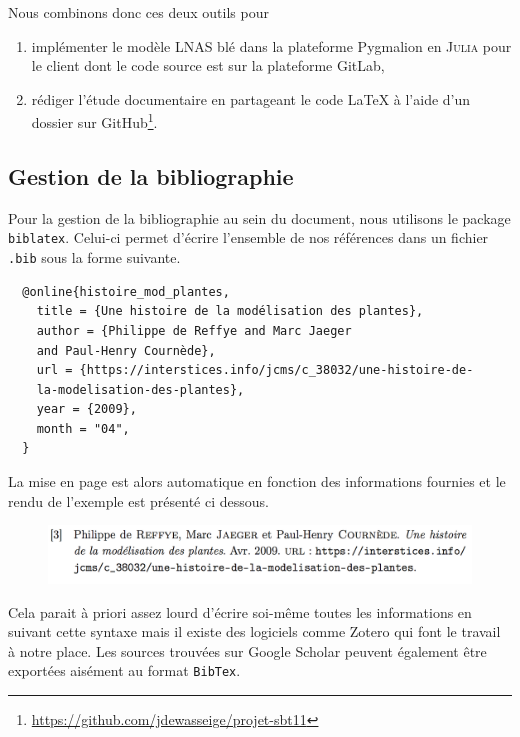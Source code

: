 Nous combinons donc ces deux outils pour 
\begin{enumerate}
  \item implémenter le modèle LNAS blé dans la plateforme
  Pygmalion en \textsc{Julia} %
  pour le client dont le code source est sur la plateforme GitLab,
  \item rédiger l'étude documentaire en partageant le code \LaTeX{}
  à l'aide d'un dossier sur 
  GitHub\footnote{\url{https://github.com/jdewasseige/projet-sbt11}}.
\end{enumerate}


\subsection{Gestion de la bibliographie}
Pour la gestion de la bibliographie au sein du document,
nous utilisons le package \texttt{biblatex}.
Celui-ci permet d'écrire l'ensemble de nos références dans un fichier \texttt{.bib}
sous la forme suivante.
\begin{verbatim}
  @online{histoire_mod_plantes,
    title = {Une histoire de la modélisation des plantes},
    author = {Philippe de Reffye and Marc Jaeger 
    and Paul-Henry Cournède},
    url = {https://interstices.info/jcms/c_38032/une-histoire-de-
    la-modelisation-des-plantes},
    year = {2009},
    month = "04",
  }
\end{verbatim}
La mise en page est alors automatique en fonction des informations fournies
et le rendu de l'exemple est présenté ci dessous.
\begin{figure}[h]
  \includegraphics[scale=0.6]{./img/rendu_elem_bib.jpg}
\end{figure}

Cela parait à priori assez lourd d'écrire soi-même toutes les informations
en suivant cette syntaxe mais il existe des logiciels comme Zotero
qui font le travail à notre place.
Les sources trouvées sur Google Scholar peuvent également être exportées
aisément au format \texttt{BibTex}.

